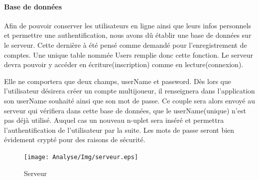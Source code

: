 	\paragraph{Base de données\\}
		Afin de pouvoir conserver les utilisateurs en ligne ainsi que leurs infos
		personnels et permettre une authentification, nous avons dû établir une
		base de données sur le serveur. Cette dernière à été pensé comme demandé pour 
		l'enregistrement de comptes. Une unique table nommée Users remplie donc cette
		fonction. Le serveur devra pouvoir y accéder en écriture(inscription) comme
		en lecture(connexion).
			
		Elle ne comportera que deux champs, userName et password. Dès lors que
		l'utilisateur désirera créer un compte multijoueur, il renseignera dans
		l'application son userName souhaité ainsi que son mot de passe. 
		Ce couple sera 	alors envoyé au serveur qui vérifiera dans cette base de
		données, que le userName(unique) n'est pas déjà utilisé. Auquel cas un nouveau n-uplet sera
		inséré et permettra l'authentification de l'utilisateur par la suite. Les mots
		de passe seront bien évidement crypté pour des raisons de sécurité.
			
		\begin{figure}
			\texttt{[image: Analyse/Img/serveur.eps]}
			 \caption {Serveur}
		\end{figure}
		
		\newpage
		
	
